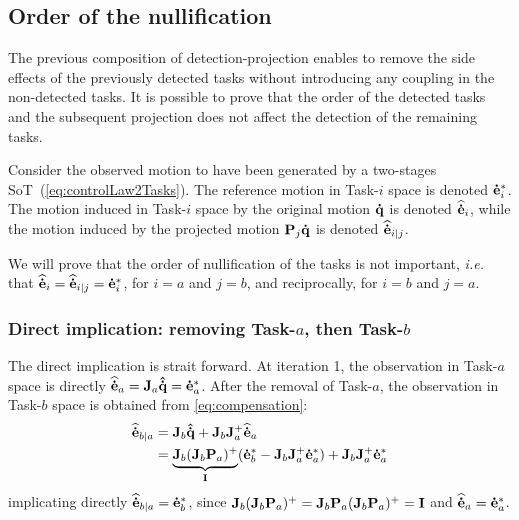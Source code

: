 \documentclass[letterpaper, 10pt, conference]{ieeeconf}      %
\begin{document}
%
%

\subsection{Order of the nullification}

The previous composition of detection-projection enables to remove the side effects of the previously detected tasks without introducing any coupling in the non-detected tasks. It is possible to prove that the order of the detected tasks and the subsequent projection does not affect the detection of the remaining tasks.

Consider the observed motion to have been generated by a two-stages
SoT~(\ref{eq:controlLaw2Tasks}). The reference motion in Task-$i$
space is denoted ${\mathbf{\dot{e}}}_{i}^*$. The motion induced in Task-$i$ space by the
original motion ${\mathbf{\dot{q}}}$ is denoted ${\mathbf{\widehat{\dot{e}}}}_{i}$, while the motion induced by
the projected motion ${\mathbf{P}}_{j} {\mathbf{\dot{q}}}$ is denoted ${\mathbf{\widehat{\dot{e}}}}_{i|j}$.

We will prove that the order of nullification of the tasks is not important,
\textit{i.e.} that ${\mathbf{\widehat{\dot{e}}}}_{i} = {\mathbf{\widehat{\dot{e}}}}_{i|j} = {\mathbf{\dot{e}}}_{i}^*$, for $i=a$ and $j=b$, and reciprocally, for $i=b$ and $j=a$.

\subsubsection{Direct implication: removing Task-$a$, then Task-$b$}

The direct implication is strait forward.
%
At iteration 1, the observation in Task-$a$ space is directly
${\mathbf{\widehat{\dot{e}}}}_{a} = {\mathbf{J}}_a{\mathbf{\hat{\dot{q}}}} = {\mathbf{\dot{e}}}_{a}^*$.  
After the removal of Task-$a$, the observation in Task-$b$ space
is obtained from \eqref{eq:compensation}:
\begin{align*}
 {\mathbf{\widehat{\dot{e}}}}_{b|a} &=  {\mathbf{J}}_b{\mathbf{\hat{\dot{q}}}} +  {\mathbf{J}}_b {\mathbf{J}}_a^+ {\mathbf{\widehat{\dot{e}}}}_{a}\\
 &= \underbrace{{\mathbf{J}}_b({\mathbf{J}}_b {\mathbf{P}}_a)^+}_{{\mathbf{I}}} ({\mathbf{\dot{e}}}_{b}^* - {\mathbf{J}}_b {\mathbf{J}}_a^+{\mathbf{\dot{e}}}_{a}^*) + {\mathbf{J}}_b {\mathbf{J}}_a^+ {\mathbf{\dot{e}}}_{a}^*
\end{align*}
implicating directly ${\mathbf{\widehat{\dot{e}}}}_{b|a}={\mathbf{\dot{e}}}_{b}^*$, since ${\mathbf{J}}_b({\mathbf{J}}_b {\mathbf{P}}_a)^+ = {\mathbf{J}}_b {\mathbf{P}}_a({\mathbf{J}}_b {\mathbf{P}}_a)^+ = {\mathbf{I}}$ and ${\mathbf{\widehat{\dot{e}}}}_{a} = {\mathbf{\dot{e}}}_{a}^*$.
\end{document}
